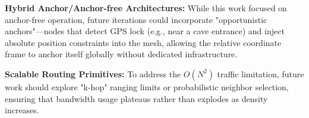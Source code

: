\noindent \textbf{Hybrid Anchor/Anchor-free Architectures:} While this work focused on anchor-free operation, future iterations could incorporate "opportunistic anchors"—nodes that detect GPS lock (e.g., near a cave entrance) and inject absolute position constraints into the mesh, allowing the relative coordinate frame to anchor itself globally without dedicated infrastructure.

\noindent \textbf{Scalable Routing Primitives:} To address the $O(N^2)$ traffic limitation, future work should explore "k-hop" ranging limits or probabilistic neighbor selection, ensuring that bandwidth usage plateaus rather than explodes as density increases.